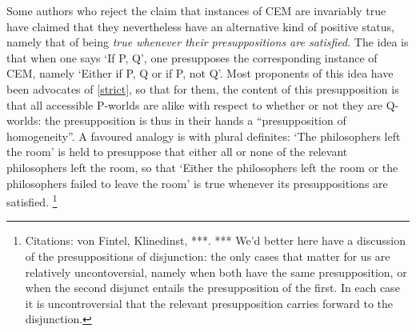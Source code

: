 \documentclass[leqno, 11pt, a5paper, openany]{article}
\begin{document}
Some authors who reject the claim that instances of CEM are invariably true have claimed that they nevertheless have an alternative kind of positive status, namely that of being \emph{true whenever their presuppositions are satisfied}.  The idea is that when one says ‘If P, Q’, one presupposes the corresponding instance of CEM, namely ‘Either if P, Q or if P, not Q’.  Most proponents of this idea have been advocates of \ref{strict}, so that for them, the content of this presupposition is that all accessible P-worlds are alike with respect to whether or not they are Q-worlds: the presupposition is thus in their hands a “presupposition of homogeneity”.  A favoured analogy is with plural definites: ‘The philosophers left the room’ is held to presuppose that either all or none of the relevant philosophers left the room, so that ‘Either the philosophers left the room or the philosophers failed to leave the room’ is true whenever its presuppositions are satisfied.%
\footnote{Citations: von Fintel, Klinedinst, ***.  *** We'd better here have a discussion of the presuppositions of disjunction: the only cases that matter for us are relatively uncontoversial, namely when both have the same presupposition, or when the second disjunct entails the presupposition of the first.  In each case it is uncontroversial that the relevant presupposition carries forward to the disjunction.  }
\end{document}
